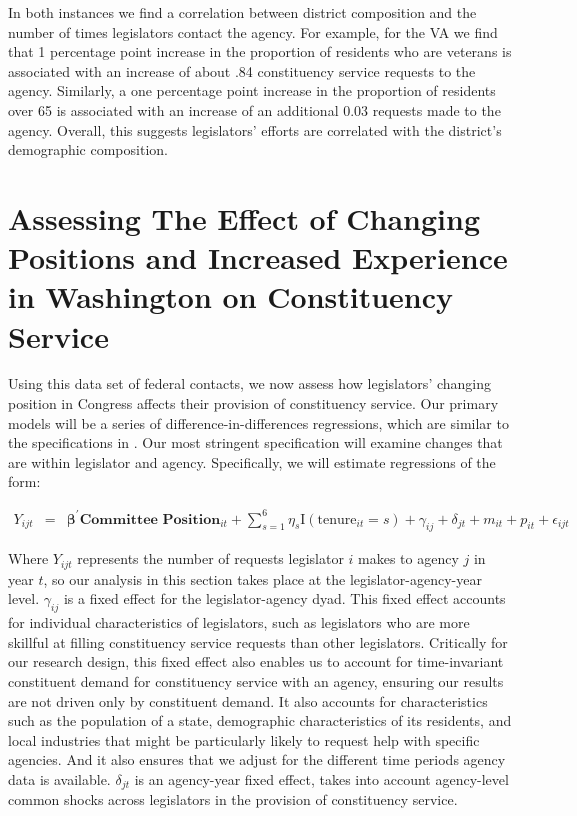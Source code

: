 \documentclass[12pt]{article}
\begin{document}
In both instances we find a correlation between district composition and the number of times legislators contact the agency. For example, for the VA we find that 1 percentage point increase in the proportion of residents who are veterans is associated with an increase of about .84 constituency service requests to the agency. Similarly, a one percentage point increase in the proportion of residents over 65 is associated with an increase of an additional 0.03 requests made to the agency. Overall, this suggests legislators' efforts are correlated with the district's demographic composition.  


\section{Assessing The Effect of Changing Positions and Increased Experience in Washington on Constituency Service}\label{s:prestige} 

Using this data set of federal contacts, we now assess how legislators' changing position in Congress affects their provision of constituency service. Our primary models will be a series of difference-in-differences regressions, which are similar to the specifications in \cite{BerryFowler2016}. Our most stringent specification will examine changes that are within legislator and agency. Specifically, we will estimate regressions of the form: 

\begin{eqnarray}
Y_{ijt} & = & \boldsymbol{\beta}^{'} \textbf{Committee Position}_{it}  + \sum_{s = 1}^{6} \eta_{s} \text{I}\left(\text{tenure}_{it} = s\right) + \gamma_{ij} + \delta_{jt} + m_{it} + p_{it} + \epsilon_{ijt} \label{e:diff1}
\end{eqnarray}

Where $Y_{ijt}$ represents the number of requests legislator $i$ makes to agency $j$ in year $t$, so our analysis in this section takes place at the legislator-agency-year level. $\gamma_{ij}$ is a fixed effect for the legislator-agency dyad. This fixed effect accounts for individual characteristics of legislators, such as legislators who are more skillful at filling constituency service requests than other legislators. Critically for our research design, this fixed effect also enables us to account for time-invariant constituent demand for constituency service with an agency, ensuring our results are not driven only by constituent demand. It also accounts for characteristics such as the population of a state, demographic characteristics of its residents, and local industries that might be particularly likely to request help with specific agencies. And it also ensures that we adjust for the different time periods agency data is available. $\delta_{jt}$ is an agency-year fixed effect, takes into account agency-level common shocks across legislators in the provision of constituency service.   
\end{document}
